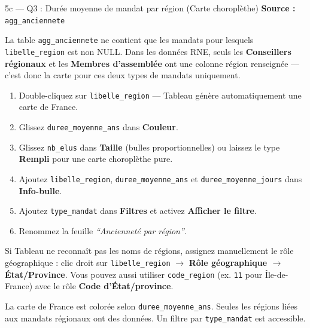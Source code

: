 \documentclass[11pt,a4paper]{article}
\begin{document}
\begin{exercice}{5c — Q3 : Durée moyenne de mandat par région (Carte choroplèthe)}
\textbf{Source :} \texttt{agg\_anciennete}

\begin{attention}
La table \texttt{agg\_anciennete} ne contient que les mandats pour lesquels \texttt{libelle\_region} est non NULL. Dans les données RNE, seuls les \textbf{Conseillers régionaux} et les \textbf{Membres d'assemblée} ont une colonne région renseignée — c'est donc la carte pour ces deux types de mandats uniquement.
\end{attention}

\begin{enumerate}[leftmargin=*]
  \item Double-cliquez sur \texttt{libelle\_region} — Tableau génère automatiquement une carte de France.
  \item Glissez \texttt{duree\_moyenne\_ans} dans \textbf{Couleur}.
  \item Glissez \texttt{nb\_elus} dans \textbf{Taille} (bulles proportionnelles) ou laissez le type \textbf{Rempli} pour une carte choroplèthe pure.
  \item Ajoutez \texttt{libelle\_region}, \texttt{duree\_moyenne\_ans} et \texttt{duree\_moyenne\_jours} dans \textbf{Info-bulle}.
  \item Ajoutez \texttt{type\_mandat} dans \textbf{Filtres} et activez \textbf{Afficher le filtre}.
  \item Renommez la feuille \textit{``Ancienneté par région''}.
\end{enumerate}

\begin{hint}
Si Tableau ne reconnaît pas les noms de régions, assignez manuellement le rôle géographique : clic droit sur \texttt{libelle\_region} $\to$ \textbf{Rôle géographique $\to$ État/Province}. Vous pouvez aussi utiliser \texttt{code\_region} (ex. \texttt{11} pour Île-de-France) avec le rôle \textbf{Code d'État/province}.
\end{hint}

\begin{validation}
La carte de France est colorée selon \texttt{duree\_moyenne\_ans}. Seules les régions liées aux mandats régionaux ont des données. Un filtre par \texttt{type\_mandat} est accessible.
\end{validation}
\end{exercice}
\end{document}
